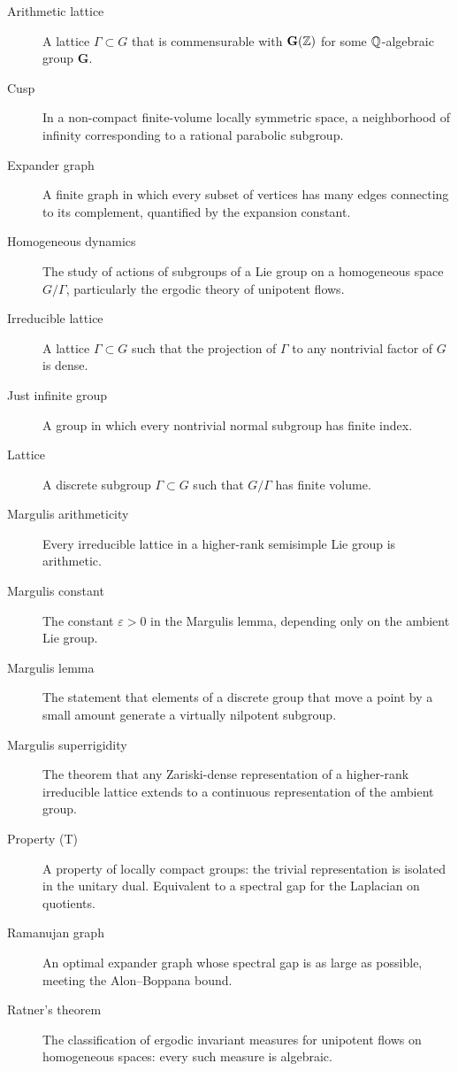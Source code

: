 \begin{description}
    \item[Arithmetic lattice] A lattice \(\Gamma \subset G\) that is commensurable with \(\mathbf{G}(\mathbb{Z})\) for some \(\mathbb{Q}\)-algebraic group \(\mathbf{G}\).
    \item[Cusp] In a non-compact finite-volume locally symmetric space, a neighborhood of infinity corresponding to a rational parabolic subgroup.
    \item[Expander graph] A finite graph in which every subset of vertices has many edges connecting to its complement, quantified by the expansion constant.
    \item[Homogeneous dynamics] The study of actions of subgroups of a Lie group on a homogeneous space \(G/\Gamma\), particularly the ergodic theory of unipotent flows.
    \item[Irreducible lattice] A lattice \(\Gamma \subset G\) such that the projection of \(\Gamma\) to any nontrivial factor of \(G\) is dense.
    \item[Just infinite group] A group in which every nontrivial normal subgroup has finite index.
    \item[Lattice] A discrete subgroup \(\Gamma \subset G\) such that \(G/\Gamma\) has finite volume.
    \item[Margulis arithmeticity] Every irreducible lattice in a higher-rank semisimple Lie group is arithmetic.
    \item[Margulis constant] The constant \(\varepsilon > 0\) in the Margulis lemma, depending only on the ambient Lie group.
    \item[Margulis lemma] The statement that elements of a discrete group that move a point by a small amount generate a virtually nilpotent subgroup.
    \item[Margulis superrigidity] The theorem that any Zariski-dense representation of a higher-rank irreducible lattice extends to a continuous representation of the ambient group.
    \item[Property (T)] A property of locally compact groups: the trivial representation is isolated in the unitary dual. Equivalent to a spectral gap for the Laplacian on quotients.
    \item[Ramanujan graph] An optimal expander graph whose spectral gap is as large as possible, meeting the Alon--Boppana bound.
    \item[Ratner's theorem] The classification of ergodic invariant measures for unipotent flows on homogeneous spaces: every such measure is algebraic.

\end{description}
